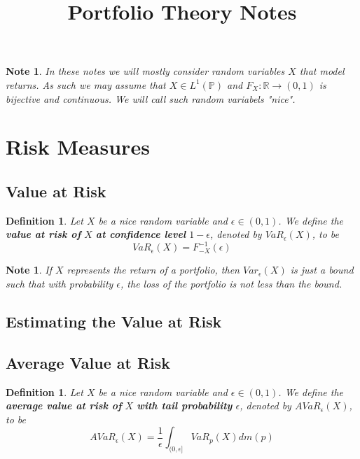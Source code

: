 \documentclass[12pt]{amsart}
\newtheorem{defn}[thm]{Definition}
\newtheorem{note}[thm]{Note}
\newcommand{\ep}{\epsilon}
\newcommand{\R}{\mathbb{R}}
\renewcommand{\P}{\mathbb{P}}
\begin{document}
\title{Portfolio Theory Notes}
\maketitle

\tableofcontents

\begin{note}
In these notes we will mostly consider random variables $X$ that model returns. As such we may assume that $X \in L^1(\P)$ and $F_X:\R \rightarrow (0,1)$ is bijective and continuous. We will call such random variabels "nice".
\end{note}

\section{Risk Measures}

\subsection{Value at Risk}

\begin{defn}
Let $X$ be a nice random variable and $\ep \in (0,1)$. We define the \textbf{value at risk of } $X$ \textbf{at confidence level } $1-\ep$, denoted by $VaR_{\ep}(X)$, to be $$VaR_{\ep}(X) = F^{-1}_{-X}(\ep)$$
\end{defn}

\begin{note}
If $X$ represents the return of a portfolio, then $Var_{\ep}(X)$ is just a bound such that with probability $\ep$, the loss of the portfolio is not less than the bound.  
\end{note}

\subsection{Estimating the Value at Risk}

\subsection{Average Value at Risk}

 \begin{defn}
Let $X$ be a nice random variable and $\ep \in (0,1)$. We define the \textbf{average value at risk of } $X$ \textbf{with tail probability } $\ep$, denoted by $AVaR_{\ep}(X)$, to be $$AVaR_{\ep}(X) = \frac{1}{\ep}\int_{(0,\ep]}VaR_p(X)dm(p)$$
\end{defn}
\end{document}
